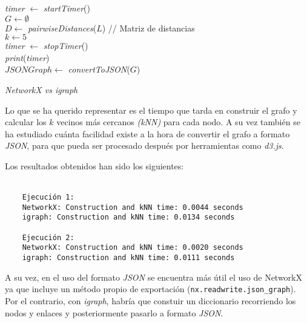 \begin{algorithm}
	\label{testGraph}
	\BlankLine
	\textit{timer} $\leftarrow$ \textit{startTimer}()\\
	$G \leftarrow \emptyset$\\
	$D \leftarrow$ \textit{pairwiseDistances}($L$) // Matriz de distancias\\
	$k \leftarrow 5$\\
	\textit{timer} $\leftarrow$ \textit{stopTimer}()\\
	\textit{print}(\textit{timer})\\
	$JSONGraph \leftarrow$ \textit{convertToJSON}($G$)\\
	\caption{\textit{NetworkX vs igraph}}
\end{algorithm}

Lo que se ha querido representar es el tiempo que tarda en construir el grafo y calcular los $k$ vecinos más cercanos \textit{(kNN)} para cada nodo. A su vez también se ha estudiado cuánta facilidad existe a la hora de convertir el grafo a formato \textit{JSON}, para que pueda ser procesado después por herramientas como \textit{d3.js}.

Los resultados obtenidos han sido los siguientes:
\\\\
\begin{verbatim}
	Ejecución 1:
	NetworkX: Construction and kNN time: 0.0044 seconds
	igraph: Construction and kNN time: 0.0134 seconds
	
	Ejecución 2:
	NetworkX: Construction and kNN time: 0.0020 seconds
	igraph: Construction and kNN time: 0.0111 seconds
\end{verbatim}

A su vez, en el uso del formato \textit{JSON} se encuentra más útil el uso de NetworkX ya que incluye un método propio de exportación (\texttt{nx.readwrite.json\_graph}).
Por el contrario, con \textit{igraph}, habría que constuir un diccionario recorriendo los nodos y enlaces y posteriormente pasarlo a formato \textit{JSON}.

